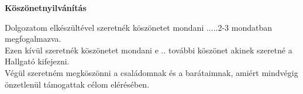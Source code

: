\textbf{\large{Köszönetnyilvánítás}}\\[32pt]

\thispagestyle{fancy}
\pagestyle{fancy}

Dolgozatom elkészültével szeretnék köszönetet mondani .....2-3 mondatban megfogalmazva.\\

Ezen kívül szeretnék köszönetet mondani e .. további köszönet akinek szeretné a Hallgató kifejezni.\\

Végül szeretném megköszönni a családomnak és a barátaimnak, amiért mindvégig önzetlenül támogattak célom elérésében.\\
\\
